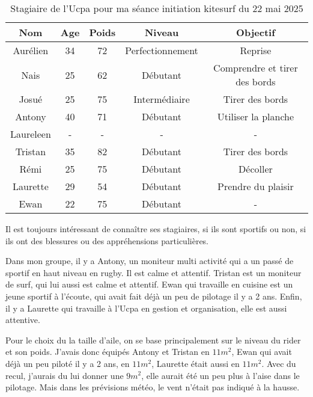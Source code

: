 \documentclass[11pt,a4paper]{report}
\begin{document}
\begin{table}
\begin{tabular}{|c|c|c|c|c|}
        \hline
        \textbf{Nom} & \textbf{Age} & \textbf{Poids}& \textbf{Niveau}     &  \textbf{Objectif} \\ 
        \hline
        Aurélien      &  34          &  72           &   Perfectionnement  & Reprise \\
        Nais          &  25          &  62           &   Débutant          & Comprendre et tirer des bords \\
        Josué         &  25          &  75           &   Intermédiaire     & Tirer des bords \\
        Antony        &  40          &  71           &   Débutant          & Utiliser la planche  \\
        Laureleen     &  -           &  -            &   -                 &   -  \\
        Tristan       &  35          & 82            &  Débutant           & Tirer des bords  \\
        Rémi          &  25          & 75            &  Débutant           &  Décoller  \\
        Laurette      &  29          & 54            &  Débutant           & Prendre du plaisir \\
        Ewan          &  22          & 75            & Débutant            &  -  \\
        \hline
\end{tabular}
\caption{Stagiaire de l'Ucpa pour ma séance initiation kitesurf du 22 mai 2025\label{stagiaires_table}}
\end{table}
Il est toujours intéressant de connaître ses stagiaires, si ils sont 
sportifs ou non, si ils ont des blessures ou des appréhensions particulières.

Dans mon groupe, il y a Antony, un moniteur multi activité qui a un passé 
de sportif en haut niveau en rugby. Il est calme et attentif.
Tristan est un moniteur de surf, qui lui aussi est calme et attentif.
Ewan qui travaille en cuisine est un jeune sportif à l'écoute, qui avait 
fait déjà un peu de pilotage il y a 2 ans.
Enfin, il y a Laurette qui travaille à l'Ucpa en gestion et organisation, elle
est aussi attentive.

Pour le choix du la taille d'aile, on se base principalement sur le niveau du rider 
et son poids. J'avais donc équipés Antony et Tristan en $11 m^2$, Ewan qui avait
déjà un peu piloté il y a 2 ans, en $11 m^2$, Laurette était aussi en $11 m^2$.
Avec du recul, j'aurais du lui donner une  $9 m^2$, elle aurait été un peu plus
à l'aise dans le pilotage. Mais dans les prévisions météo, le vent n'était pas
indiqué à la hausse.
\end{document}
